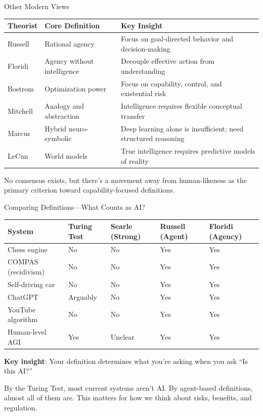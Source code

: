 \documentclass[aspectratio=169,11pt]{beamer}
\begin{document}
\begin{frame}{Other Modern Views}
\begin{table}[h]
\centering
\scriptsize
\begin{tabular}{@{}p{2cm}p{4cm}p{6cm}@{}}
\toprule
\textbf{Theorist} & \textbf{Core Definition} & \textbf{Key Insight} \\
\midrule
Russell & Rational agency & Focus on goal-directed behavior and decision-making \\
\addlinespace
Floridi & Agency without intelligence & Decouple effective action from understanding \\
\addlinespace
Bostrom & Optimization power & Focus on capability, control, and existential risk \\
\addlinespace
Mitchell & Analogy and abstraction & Intelligence requires flexible conceptual transfer \\
\addlinespace
Marcus & Hybrid neuro-symbolic & Deep learning alone is insufficient; need structured reasoning \\
\addlinespace
LeCun & World models & True intelligence requires predictive models of reality \\
\bottomrule
\end{tabular}
\end{table}

\vspace{0.2em}
No consensus exists, but there's a movement away from human-likeness as the primary criterion toward capability-focused definitions.
\end{frame}

\begin{frame}{Comparing Definitions---What Counts as AI?}
\begin{table}[h]
\centering
\scriptsize
\begin{tabular}{@{}p{2.8cm}p{2cm}p{2cm}p{2.5cm}p{2.5cm}@{}}
\toprule
\textbf{System} & \textbf{Turing Test} & \textbf{Searle (Strong)} & \textbf{Russell (Agent)} & \textbf{Floridi (Agency)} \\
\midrule
Chess engine & No & No & Yes & Yes \\
COMPAS (recidivism) & No & No & Yes & Yes \\
Self-driving car & No & No & Yes & Yes \\
ChatGPT & Arguably & No & Yes & Yes \\
YouTube algorithm & No & No & Yes & Yes \\
Human-level AGI & Yes & Unclear & Yes & Yes \\
\bottomrule
\end{tabular}
\end{table}

\vspace{0.2em}
\textbf{Key insight}: Your definition determines what you're asking when you ask ``Is this AI?''

\vspace{0.2em}
By the Turing Test, most current systems aren't AI. By agent-based definitions, almost all of them are. This matters for how we think about risks, benefits, and regulation.
\end{frame}
\end{document}
